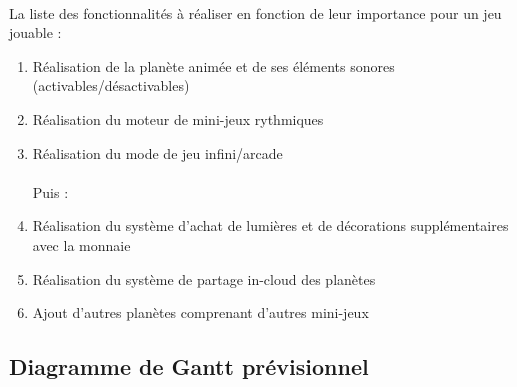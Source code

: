\paragraph{}
La liste des fonctionnalités à réaliser en fonction de leur importance pour un jeu jouable :
\begin{enumerate}
\item Réalisation de la planète animée et de ses éléments sonores (activables/désactivables)
\item Réalisation du moteur de mini-jeux rythmiques
\item Réalisation du mode de jeu infini/arcade
\\\\Puis :
\item Réalisation du système d’achat de lumières et de décorations supplémentaires avec la monnaie
\item Réalisation du système de partage in-cloud des planètes
\item Ajout d’autres planètes comprenant d’autres mini-jeux
\end{enumerate}

\subsection{Diagramme de Gantt prévisionnel}
\newpage

